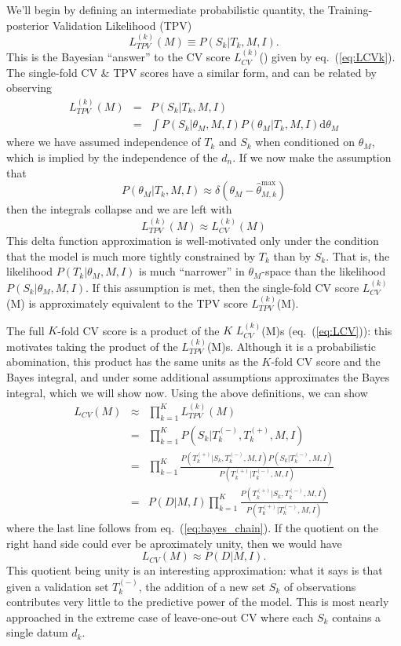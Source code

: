 \documentclass[12pt]{article}
\newcommand{\dd}{\mathrm{d}}
\newcommand{\thetamax}[1]{\ensuremath{\hat{\theta}^{\max}_{#1}}}
\newcommand{\LCV}[1]{\ensuremath{L_{CV}}(#1)}
\newcommand{\LCVk}[1]{\ensuremath{L^{(k)}_{CV}}(#1)}
\newcommand{\LTPVk}[1]{\ensuremath{L^{(k)}_{TPV}}(#1)}
\newcommand{\Tkplus}{\ensuremath{T_k^{(+)}}}
\newcommand{\Tkminus}{\ensuremath{T_k^{(-)}}}
\newcommand{\eqn}[1]{eq.~(\ref{eq:#1})}
\begin{document}
We'll begin by defining an intermediate probabilistic quantity, the
Training-posterior Validation Likelihood (TPV)
\begin{equation}
  \label{eq:LTPVk}
  \LTPVk{M} \equiv P(S_k|T_k, M, I).
\end{equation}
This is the Bayesian ``answer'' to the CV score \LCVk{} given by
\eqn{LCVk}.  The single-fold CV \& TPV scores have a similar form,
and can be related by observing
\begin{eqnarray}
  \LTPVk{M} &=& P(S_k|T_k,M,I)\\
            &=& \int P(S_k|\theta_M,M,I) P(\theta_M|T_k,M,I)\dd\theta_M
\end{eqnarray}
where we have assumed independence of $T_k$ and $S_k$ when conditioned on
$\theta_M$, which is implied by the independence of the  $d_n$.  If we
now make the assumption that
\begin{equation}
  P(\theta_M|T_k,M,I) \approx \delta(\theta_M - \thetamax{M,k})
\end{equation}
then the integrals collapse and we are left with
\begin{equation}
  \LTPVk{M} \approx \LCVk{M}
\end{equation}
This delta function approximation is well-motivated only under the condition
that the model is much more tightly constrained by $T_k$ than by $S_k$.
That is, the likelihood $P(T_k|\theta_M,M,I)$ is much ``narrower'' in
$\theta_M$-space than the likelihood $P(S_k|\theta_M,M,I)$.
If this assumption is met, then the single-fold CV score \LCVk{M} is
approximately equivalent to the TPV score \LTPVk{M}.

The full $K$-fold CV score is a product of the $K$ \LCVk{M}s (\eqn{LCV}):
this motivates taking the product of the \LTPVk{M}s.
Although it is a probabilistic abomination, this product has the same units
as the $K$-fold CV score and the Bayes integral, and under some additional
assumptions approximates the Bayes integral, which we will show now.
Using the above definitions, we can show
\begin{eqnarray}
  \LCV{M} &\approx& \prod_{k=1}^K \LTPVk{M} \\
          &=& \prod_{k=1}^K P(S_k|\Tkminus,\Tkplus,M,I)\\
          &=& \prod_{k-1}^K \frac{P(\Tkplus|S_k,\Tkminus,M,I) P(S_k|\Tkminus,M,I)}
                               {P(\Tkplus|\Tkminus,M,I)}\\
          &=& P(D|M,I) \prod_{k=1}^K \frac{P(\Tkplus|S_k,\Tkminus,M,I)}
                                        {P(\Tkplus|\Tkminus,M,I)}
\end{eqnarray}
where the last line follows from \eqn{bayes_chain}.
If the quotient on the right hand side could ever be
aproximately unity, then we would have
\begin{equation}
  \LCV{M} \approx P(D|M,I).
\end{equation}
This quotient being unity is an interesting approximation: what it says is that
given a validation set \Tkminus{}, the addition of a new set $S_k$ of
observations contributes very little to the predictive power of the model.
This is most nearly approached in the extreme case of leave-one-out CV
where each $S_k$ contains a single datum $d_k$.
\end{document}
